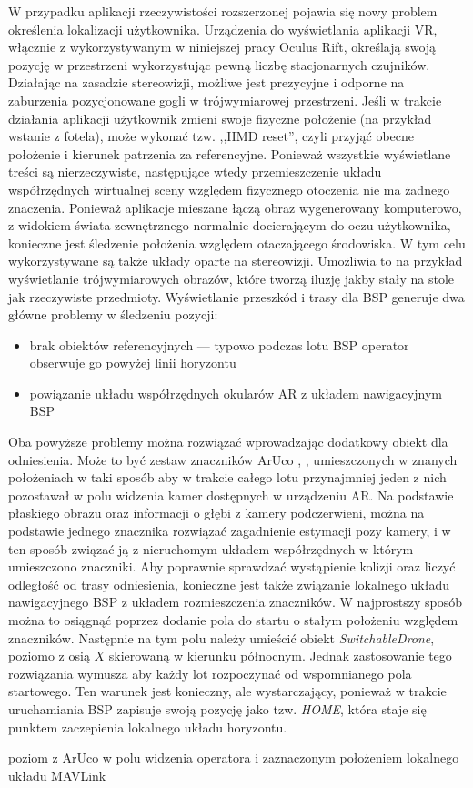 W przypadku aplikacji rzeczywistości rozszerzonej pojawia się nowy problem określenia lokalizacji użytkownika. Urządzenia do wyświetlania aplikacji VR, włącznie z wykorzystywanym w niniejszej pracy Oculus Rift, określają swoją pozycję w przestrzeni wykorzystując pewną liczbę stacjonarnych czujników. Działając na zasadzie stereowizji, możliwe jest prezycyjne i odporne na zaburzenia pozycjonowane gogli w trójwymiarowej przestrzeni. Jeśli w trakcie działania aplikacji użytkownik zmieni swoje fizyczne położenie (na przykład wstanie z fotela), może wykonać tzw. ,,HMD reset'', czyli przyjąć obecne położenie i kierunek patrzenia za referencyjne. Ponieważ wszystkie wyświetlane treści są nierzeczywiste, następujące wtedy przemieszczenie układu współrzędnych wirtualnej sceny względem fizycznego otoczenia nie ma żadnego znaczenia. Ponieważ aplikacje mieszane łączą obraz wygenerowany komputerowo, z widokiem świata zewnętrznego normalnie docierającym do oczu użytkownika, konieczne jest śledzenie położenia względem otaczającego środowiska. W tym celu wykorzystywane są także układy oparte na stereowizji. Umożliwia to na przykład wyświetlanie trójwymiarowych obrazów, które tworzą iluzję jakby stały na stole jak rzeczywiste przedmioty. Wyświetlanie przeszkód i trasy dla BSP generuje dwa główne problemy w śledzeniu pozycji:
\begin{itemize}
    \item brak obiektów referencyjnych --- typowo podczas lotu BSP operator obserwuje go powyżej linii horyzontu
    \item powiązanie układu współrzędnych okularów AR z układem nawigacyjnym BSP
\end{itemize}

Oba powyższe problemy można rozwiązać wprowadzając dodatkowy obiekt dla odniesienia. Może to być zestaw znaczników ArUco \cite{aruco2016}, \cite{aruco2018}, umieszczonych w znanych położeniach w taki sposób aby w trakcie całego lotu przynajmniej jeden z nich pozostawał w polu widzenia kamer dostępnych w urządzeniu AR. Na podstawie płaskiego obrazu oraz informacji o głębi z kamery podczerwieni, można na podstawie jednego znacznika rozwiązać zagadnienie estymacji pozy kamery, i w ten sposób związać ją z nieruchomym układem współrzędnych w którym umieszczono znaczniki. Aby poprawnie sprawdzać wystąpienie kolizji oraz liczyć odległość od trasy odniesienia, konieczne jest także związanie lokalnego układu nawigacyjnego BSP z układem rozmieszczenia znaczników. W najprostszy sposób można to osiągnąć poprzez dodanie pola do startu o stałym położeniu względem znaczników. Następnie na tym polu należy umieścić obiekt \emph{SwitchableDrone}, poziomo z osią $ X $ skierowaną w kierunku północnym. Jednak zastosowanie tego rozwiązania wymusza aby każdy lot rozpoczynać od wspomnianego pola startowego. Ten warunek jest konieczny, ale wystarczający, ponieważ w trakcie uruchamiania BSP zapisuje swoją pozycję jako tzw. \emph{HOME}, która staje się punktem zaczepienia lokalnego układu horyzontu.

\begin{todo}
    poziom z ArUco w polu widzenia operatora i zaznaczonym położeniem lokalnego układu MAVLink
\end{todo}
